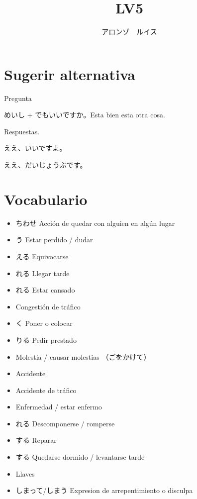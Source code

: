 \documentclass[a4paper,lualatex,ja=standard,base=10pt]{bxjsarticle}
\title{\ruby{第|０７|課}{だい||か} LV5}
\author{アロンゾ　ルイス}
\begin{document}
\setcounter{page}{1}

%
\maketitle{}
\thispagestyle{fancy}

\section{Sugerir alternativa}

Pregunta

めいし + でもいいですか。Esta bien esta otra cosa.

Respuestas.

ええ、いいですよ。

ええ、だいじょうぶです。

\section{Vocabulario}

\begin{itemize}
  \item {}ちわせ Acción de quedar con alguien en algún lugar
  \item {}う Estar perdido / dudar
  \item {}える Equivocarse
  \item {}れる Llegar tarde
  \item {}れる Estar cansado
  \item {} Congestión de tráfico
  \item {}く Poner o colocar
  \item {}りる Pedir prestado
  \item {} Molestia / causar molestias （ごをかけて）
  \item {} Accidente
  \item {} Accidente de tráfico
  \item {} Enfermedad / estar enfermo
  \item {}れる Descomponerse / romperse
  \item {}する Reparar
  \item {}する Quedarse dormido / levantarse tarde
  \item {} Llaves
  \item しまって/しまう Expresion de arrepentimiento o disculpa
\end{itemize}
\end{document}
